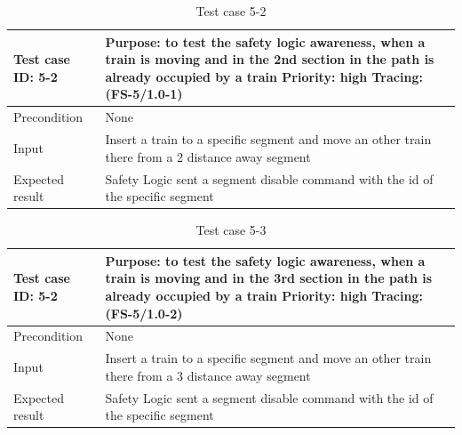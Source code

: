 \begin{table}[H]
	\caption{Test case 5-2}
	\label{table:TCase-FS5-2}
	\begin{center}
		\renewcommand{\arraystretch}{1.8}
		\begin{tabu} 
			to 0.9 \textwidth
			{  X[0.4, c] X[c] }
			\toprule
			Test case ID: 5-2 & Purpose: to test the safety logic awareness, when a train is moving and in the 2nd section in the path is already occupied by a train \newline Priority: high \newline Tracing: (FS-5/1.0-1)\\ \midrule
			Precondition & None  \\
			Input & Insert a train to a specific segment and move an other train there from a 2 distance away segment\\
			Expected result & Safety Logic sent a segment disable command with the id of the specific segment \\ \bottomrule
		\end{tabu}
	\end{center}
\end{table} 

\begin{table}[H]
	\caption{Test case 5-3}
	\label{table:TCase-FS5-3}
	\begin{center}
		\renewcommand{\arraystretch}{1.8}
		\begin{tabu} 
			to 0.9 \textwidth
			{  X[0.4, c] X[c] }
			\toprule
			Test case ID: 5-2 & Purpose: to test the safety logic awareness, when a train is moving and in the 3rd section in the path is already occupied by a train \newline Priority: high \newline Tracing: (FS-5/1.0-2)\\ \midrule
			Precondition & None  \\
			Input & Insert a train to a specific segment and move an other train there from a 3 distance away segment\\
			Expected result & Safety Logic sent a segment disable command with the id of the specific segment \\ \bottomrule
		\end{tabu}
	\end{center}
\end{table} 

